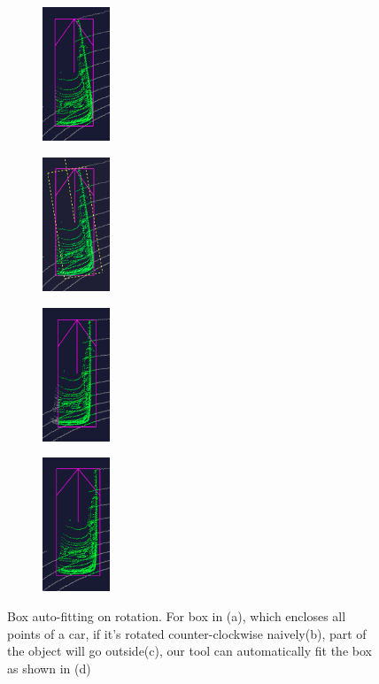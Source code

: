 \documentclass[letterpaper, 10 pt, conference]{ieeeconf}  %
\begin{document}
\begin{figure}[t]
	\centering
	
	\begin{subfigure}[t]{0.2\linewidth}
		\includegraphics[height=4cm]{./figures/points-enclosed}
		\caption{}
		\label{fig:box-before-rotate}
	\end{subfigure}\hfill
	\begin{subfigure}[t]{0.2\linewidth}
		\includegraphics[height=4cm]{./figures/adjust-naively}
		\caption{}
		\label{fig:box-rotate-in-subview}
	\end{subfigure}\hfill
	\begin{subfigure}[t]{0.2\linewidth}
		\includegraphics[height=4cm]{./figures/rotate-fail}
		\caption{}
	\end{subfigure}\hfill
	\begin{subfigure}[t]{0.2\linewidth}
		\includegraphics[height=4cm]{./figures/rotate-success}
		\caption{}
	\end{subfigure}\hfill
	\caption{Box auto-fitting on rotation. For box in (a), which encloses all points of a car, if it's rotated counter-clockwise naively(b), part of the object will go outside(c), our tool can automatically fit the box as shown in (d)}
	\label{fig:boundary-aware-rotation}
	\vspace{-0.3cm}
\end{figure}
\end{document}
